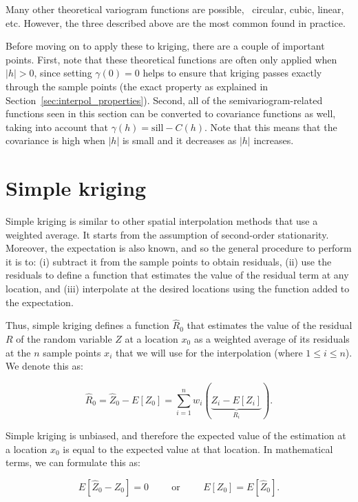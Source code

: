 Many other theoretical variogram functions are possible, \eg\ circular, cubic, linear, etc.
However, the three described above are the most common found in practice.

Before moving on to apply these to kriging, there are a couple of important points.
First, note that these theoretical functions are often only applied when \(|h| > 0\), since setting \(\gamma(0) = 0\) helps to ensure that kriging passes exactly through the sample points (the exact property as explained in Section~\ref{sec:interpol_properties}).
Second, all of the semivariogram-related functions seen in this section can be converted to covariance functions as well, taking into account that \(\gamma(h) = \mathrm{sill} - C(h)\).
Note that this means that the covariance is high when \(|h|\) is small and it decreases as \(|h|\) increases.

\section{Simple kriging}

Simple kriging is similar to other spatial interpolation methods that use a weighted average.
It starts from the assumption of second-order stationarity.
Moreover, the expectation is also known, and so the general procedure to perform it is to: (i) subtract it from the sample points to obtain residuals, (ii) use the residuals to define a function that estimates the value of the residual term at any location, and (iii) interpolate at the desired locations using the function added to the expectation.

Thus, simple kriging defines a function \(\hat{R}_0\) that estimates the value of the residual \(R\) of the random variable \(Z\) at a location \(x_0\) as a weighted average of its residuals at the \(n\) sample points \(x_i\) that we will use for the interpolation (where \(1 \leq i \leq n\)).
We denote this as:

\begin{equation}
\label{eq:wask}
\hat{R}_0 = \hat{Z}_0 - E[Z_0] = \sum_{i=1}^n w_i (\underbrace{Z_i-E[Z_i]}_{R_i}).
\end{equation}

Simple kriging is unbiased, and therefore the expected value of the estimation at a location \(x_0\) is equal to the expected value at that location.
In mathematical terms, we can formulate this as:

\begin{equation}
\label{eq:unbiased}
E\left[ \hat{Z}_0 - Z_0 \right] = 0 \hspace{1cm}\text{or}\hspace{1cm}E\left[Z_0\right] = E\left[ \hat{Z}_0 \right].
\end{equation}

